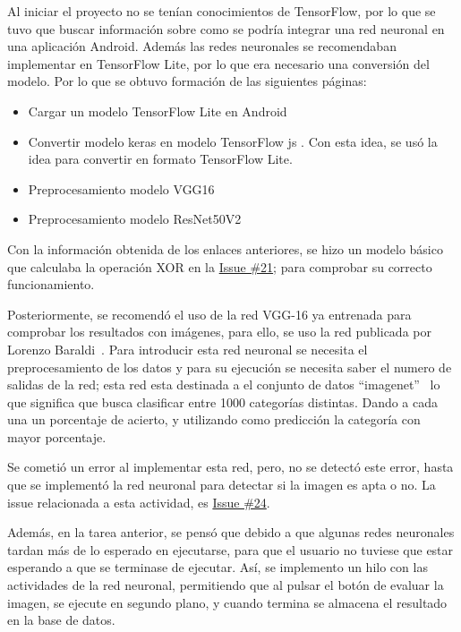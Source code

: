 Al iniciar el proyecto no se tenían conocimientos de TensorFlow, por lo que se tuvo que buscar información sobre como se podría integrar una red neuronal en una aplicación Android. Además las redes neuronales se recomendaban implementar en TensorFlow Lite, por lo que era necesario una conversión del modelo. Por lo que se obtuvo formación de las siguientes páginas:
\begin{itemize}
    \item Cargar un modelo TensorFlow Lite en Android \cite{tensorflow-lite-android-quickstart}
    \item Convertir modelo keras en modelo TensorFlow js \cite{tensorflow-js-import-keras}. Con esta idea, se usó la idea para convertir en formato TensorFlow Lite.
    \item Preprocesamiento modelo VGG16~\cite{tensorflowVGG16}
    \item Preprocesamiento modelo ResNet50V2~\cite{tensorflowResNet50V2}
\end{itemize}

Con la información obtenida de los enlaces anteriores, se hizo un modelo básico que calculaba la operación XOR en la \href{https://github.com/mfg1014/Retinopatia-diabetica/issues/21}{Issue \#21}; para comprobar su correcto funcionamiento.

Posteriormente, se recomendó el uso de la red VGG-16 ya entrenada para comprobar los resultados con imágenes, para ello, se uso la red publicada por Lorenzo Baraldi~\cite{github-vgg16}. Para introducir esta red neuronal se necesita el preprocesamiento de los datos y para su ejecución se necesita saber el numero de salidas de la red; esta red esta destinada a el conjunto de datos ``imagenet''~\cite{github-imagenet-classes} lo que significa que busca clasificar entre 1000 categorías distintas. Dando a cada una un porcentaje de acierto, y utilizando como predicción la categoría con mayor porcentaje.

Se cometió un error al implementar esta red, pero, no se detectó este error, hasta que se implementó la red neuronal para detectar si la imagen es apta o no. La issue relacionada a esta actividad, es \href{https://github.com/mfg1014/Retinopatia-diabetica/issues/24}{Issue \#24}.

Además, en la tarea anterior, se pensó que debido a que algunas redes neuronales tardan más de lo esperado en ejecutarse, para que el usuario no tuviese que estar esperando a que se terminase de ejecutar. Así, se implemento un hilo con las actividades de la red neuronal, permitiendo que al pulsar el botón de evaluar la imagen, se ejecute en segundo plano, y cuando termina se almacena el resultado en la base de datos.

